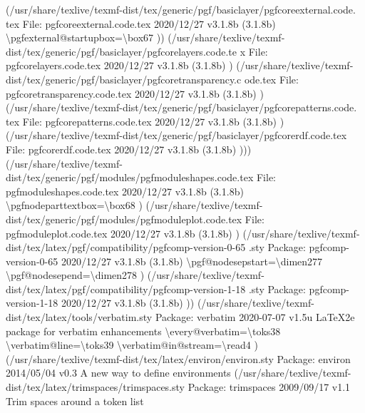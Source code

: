 \documentclass[
  letterpaper,
  DIV=11,
  numbers=noendperiod]{scrartcl}
\newenvironment{Shaded}{\begin{snugshade}}{\end{snugshade}}
\newcommand{\NormalTok}[1]{\textcolor[rgb]{0.00,0.23,0.31}{#1}}
\begin{document}
\begin{Shaded}
\begin{Highlighting}[]
\NormalTok{(/usr/share/texlive/texmf{-}dist/tex/generic/pgf/basiclayer/pgfcoreexternal.code.}
\NormalTok{tex}
\NormalTok{File: pgfcoreexternal.code.tex 2020/12/27 v3.1.8b (3.1.8b)}
\NormalTok{\textbackslash{}pgfexternal@startupbox=\textbackslash{}box67}
\NormalTok{))}
\NormalTok{(/usr/share/texlive/texmf{-}dist/tex/generic/pgf/basiclayer/pgfcorelayers.code.te}
\NormalTok{x}
\NormalTok{File: pgfcorelayers.code.tex 2020/12/27 v3.1.8b (3.1.8b)}
\NormalTok{)}
\NormalTok{(/usr/share/texlive/texmf{-}dist/tex/generic/pgf/basiclayer/pgfcoretransparency.c}
\NormalTok{ode.tex}
\NormalTok{File: pgfcoretransparency.code.tex 2020/12/27 v3.1.8b (3.1.8b)}
\NormalTok{)}
\NormalTok{(/usr/share/texlive/texmf{-}dist/tex/generic/pgf/basiclayer/pgfcorepatterns.code.}
\NormalTok{tex}
\NormalTok{File: pgfcorepatterns.code.tex 2020/12/27 v3.1.8b (3.1.8b)}
\NormalTok{) (/usr/share/texlive/texmf{-}dist/tex/generic/pgf/basiclayer/pgfcorerdf.code.tex}
\NormalTok{File: pgfcorerdf.code.tex 2020/12/27 v3.1.8b (3.1.8b)}
\NormalTok{)))}
\NormalTok{(/usr/share/texlive/texmf{-}dist/tex/generic/pgf/modules/pgfmoduleshapes.code.tex}
\NormalTok{File: pgfmoduleshapes.code.tex 2020/12/27 v3.1.8b (3.1.8b)}
\NormalTok{\textbackslash{}pgfnodeparttextbox=\textbackslash{}box68}
\NormalTok{) (/usr/share/texlive/texmf{-}dist/tex/generic/pgf/modules/pgfmoduleplot.code.tex}
\NormalTok{File: pgfmoduleplot.code.tex 2020/12/27 v3.1.8b (3.1.8b)}
\NormalTok{)}
\NormalTok{(/usr/share/texlive/texmf{-}dist/tex/latex/pgf/compatibility/pgfcomp{-}version{-}0{-}65}
\NormalTok{.sty}
\NormalTok{Package: pgfcomp{-}version{-}0{-}65 2020/12/27 v3.1.8b (3.1.8b)}
\NormalTok{\textbackslash{}pgf@nodesepstart=\textbackslash{}dimen277}
\NormalTok{\textbackslash{}pgf@nodesepend=\textbackslash{}dimen278}
\NormalTok{)}
\NormalTok{(/usr/share/texlive/texmf{-}dist/tex/latex/pgf/compatibility/pgfcomp{-}version{-}1{-}18}
\NormalTok{.sty}
\NormalTok{Package: pgfcomp{-}version{-}1{-}18 2020/12/27 v3.1.8b (3.1.8b)}
\NormalTok{)) (/usr/share/texlive/texmf{-}dist/tex/latex/tools/verbatim.sty}
\NormalTok{Package: verbatim 2020{-}07{-}07 v1.5u LaTeX2e package for verbatim enhancements}
\NormalTok{\textbackslash{}every@verbatim=\textbackslash{}toks38}
\NormalTok{\textbackslash{}verbatim@line=\textbackslash{}toks39}
\NormalTok{\textbackslash{}verbatim@in@stream=\textbackslash{}read4}
\NormalTok{) (/usr/share/texlive/texmf{-}dist/tex/latex/environ/environ.sty}
\NormalTok{Package: environ 2014/05/04 v0.3 A new way to define environments}
\NormalTok{(/usr/share/texlive/texmf{-}dist/tex/latex/trimspaces/trimspaces.sty}
\NormalTok{Package: trimspaces 2009/09/17 v1.1 Trim spaces around a token list}

\end{Highlighting}
\end{Shaded}
\end{document}
